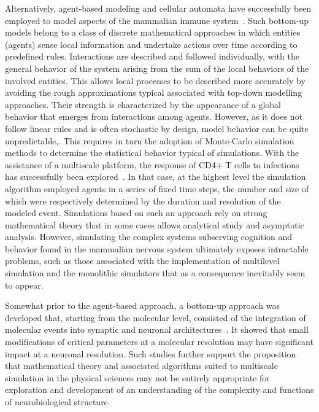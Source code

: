 \documentclass[11pt,3p,twocolumn]{JMN}
\begin{document}
Alternatively, agent-based modeling and cellular automata have successfully been employed to model aspects of the mammalian immune system~\citep{chiacchio14}. Such bottom-up models belong to a class of discrete mathematical approaches in which entities (agents) sense local information and undertake actions over time according to predefined rules. Interactions are described and followed individually, with the general behavior of the system arising from the sum of the local behaviors of the involved entities. This allows local processes to be described more accurately by avoiding the rough approximations typical associated with top-down modelling approaches. Their strength is characterized by the appearance of a global behavior that emerges from interactions among agents. However, as it does not follow linear rules and is often stochastic by design, model behavior can be quite unpredictable,. This requires in turn the adoption of Monte-Carlo simulation methods to determine the statistical behavior typical of simulations. With the assistance of a multiscale platform, the response of CD4+ T cells to infections has successfully been explored~\citep{wertheim21}. In that case, at the highest level the simulation algorithm employed agents in a series of fixed time steps, the number and size of which were respectively determined by the duration and resolution of the modeled event. Simulations based on such an approach rely on strong mathematical theory that in some cases allows analytical study and asymptotic analysis. However, simulating the complex systems subserving cognition and behavior found in the mammalian nervous system ultimately exposes intractable problems, such as those associated with the implementation of multilevel simulation and the monolithic simulators that as a consequence inevitably seem to appear.

Somewhat prior to the agent-based approach, a bottom-up approach was developed that, starting from the molecular level, consisted of the integration of molecular events into synaptic and neuronal architectures~\citep{bouteiller11}. It showed that small modifications of critical parameters at a molecular resolution may have significant impact at a neuronal resolution. Such studies further support the proposition that mathematical theory and associated algorithms suited to multiscale simulation in the physical sciences may not be entirely appropriate for exploration and development of an understanding of the complexity and functions of neurobiological structure.
\end{document}
